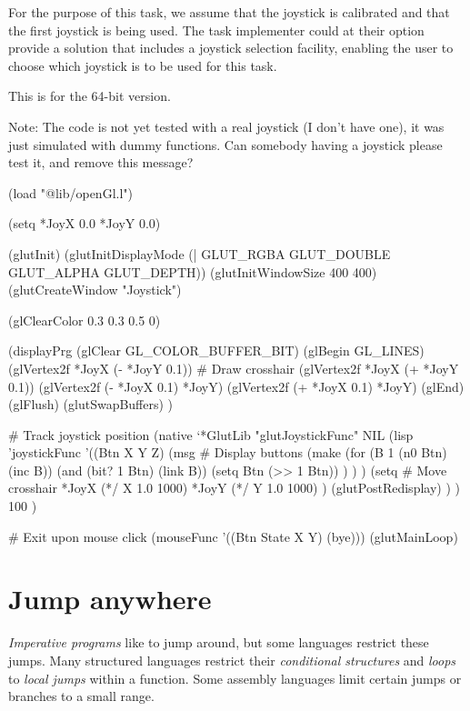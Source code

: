 For the purpose of this task, we assume that the joystick is calibrated
and that the first joystick is being used. The task implementer could at
their option provide a solution that includes a joystick selection
facility, enabling the user to choose which joystick is to be used for
this task.


\begin{wideverbatim}

This is for the 64-bit version.

Note: The code is not yet tested with a real joystick (I don't have one), it was
just simulated with dummy functions. Can somebody having a joystick please test
it, and remove this message?

(load "@lib/openGl.l")

(setq *JoyX 0.0  *JoyY 0.0)

(glutInit)
(glutInitDisplayMode (| GLUT_RGBA GLUT_DOUBLE GLUT_ALPHA GLUT_DEPTH))
(glutInitWindowSize 400 400)
(glutCreateWindow "Joystick")

(glClearColor 0.3 0.3 0.5 0)

(displayPrg
   (glClear GL_COLOR_BUFFER_BIT)
   (glBegin GL_LINES)
   (glVertex2f *JoyX (- *JoyY 0.1))  # Draw crosshair
   (glVertex2f *JoyX (+ *JoyY 0.1))
   (glVertex2f (- *JoyX 0.1) *JoyY)
   (glVertex2f (+ *JoyX 0.1) *JoyY)
   (glEnd)
   (glFlush)
   (glutSwapBuffers) )

# Track joystick position
(native `*GlutLib "glutJoystickFunc" NIL
   (lisp 'joystickFunc
      '((Btn X Y Z)
         (msg                          # Display buttons
            (make
               (for (B 1 (n0 Btn) (inc B))
                  (and (bit? 1 Btn) (link B))
                  (setq Btn (>> 1 Btn)) ) ) )
         (setq                         # Move crosshair
            *JoyX (*/ X 1.0 1000)
            *JoyY (*/ Y 1.0 1000) )
         (glutPostRedisplay) ) )
   100 )

# Exit upon mouse click
(mouseFunc '((Btn State X Y) (bye)))
(glutMainLoop)

\end{wideverbatim}

\pagebreak{}
\section*{Jump anywhere}

\emph{Imperative programs} like to jump around, but some languages
restrict these jumps. Many structured languages restrict their
\emph{conditional structures} and \emph{loops} to \emph{local jumps}
within a function. Some assembly languages limit certain jumps or
branches to a small range.

